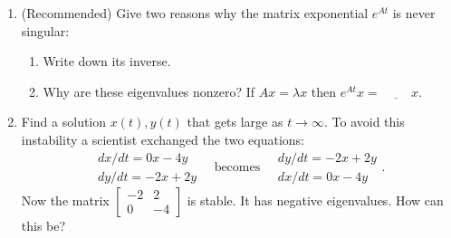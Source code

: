 \documentclass[14pt, a4paper]{article}
\begin{document}
\begin{enumerate}
    \item (Recommended) Give two reasons why the matrix exponential $e^{At}$ is never singular:
          \begin{enumerate}
              \item Write down its inverse.
              \item Why are these eigenvalues nonzero? If $Ax = \lambda x$ then $e^{At}x = \underline{\hspace{1cm}} x$.
          \end{enumerate}

    \item Find a solution $x(t), y(t)$ that gets large as $t \to \infty$. To avoid this instability a scientist exchanged the two equations:
          \[
              \begin{matrix} dx/dt = 0x - 4y \\ dy/dt = -2x + 2y \end{matrix} \quad \text{becomes} \quad \begin{matrix} dy/dt = -2x + 2y \\ dx/dt = 0x - 4y \end{matrix} .
          \]
          Now the matrix $\begin{bmatrix} -2 & 2 \\ 0 & -4 \end{bmatrix}$ is stable. It has negative eigenvalues. How can this be?
\end{enumerate}
\end{document}
